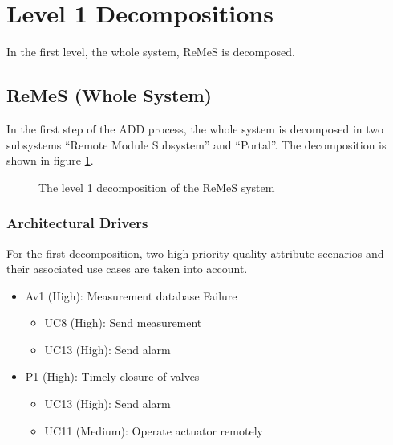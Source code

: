 \section{Level 1 Decompositions}
\label{sec:level-1}

\npar In the first level, the whole system, ReMeS is decomposed. 

\subsection{ReMeS (Whole System)}
\label{dec:whole-system}

\npar In the first step of the ADD process, the whole system is decomposed in
two subsystems ``Remote Module Subsystem'' and ``Portal''. The decomposition is
shown in figure \ref{fig:dec/level-1}.

\begin{figure}[H]
	\begin{centering}
		\caption{The level 1 decomposition of the ReMeS system}
		\label{fig:dec/level-1}
	\end{centering}
\end{figure}

\subsubsection{Architectural Drivers}
\label{drivers:whole-system}

\npar For the first decomposition, two high priority quality attribute scenarios
and their associated use cases are taken into account. 

\begin{itemize}
 	\item Av1 (High): Measurement database Failure
 	\begin{itemize}
 		\item UC8 (High): Send measurement
 		\item UC13 (High): Send alarm 
 	\end{itemize}
  	\item P1 (High): Timely closure of valves
  	\begin{itemize}
  		\item UC13 (High): Send alarm 
		\item UC11 (Medium): Operate actuator remotely 
  	\end{itemize}
\end{itemize}

